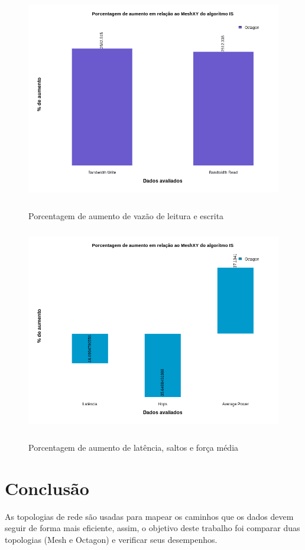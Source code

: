 \documentclass[12pt]{article}
\begin{document}
\begin{figure}[H]
\centering
\includegraphics[width=15cm, height=9cm]{imagens/is2.png}
\label{foto2}
\caption{Porcentagem de aumento de vazão de leitura e escrita}
\end{figure}

\begin{figure}[H]
\centering
\includegraphics[width=15cm, height=9cm]{imagens/is.png}
\label{foto1}
\caption{Porcentagem de aumento de latência, saltos e força média}
\end{figure}

\section{Conclusão}\label{sec:conc}
 As topologias de rede são usadas para mapear os caminhos que os dados devem seguir de forma mais eficiente, assim, o objetivo deste trabalho foi comparar duas topologias (Mesh e Octagon) e verificar seus desempenhos. 
 
\end{document}
